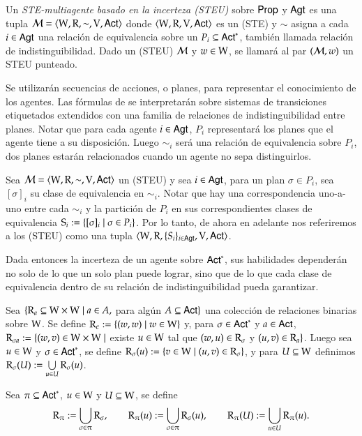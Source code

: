 \begin{definicion}
    Un \emph{STE-multiagente basado en la incerteza (STEU)} sobre $\PROP$ y $\AGT$ es una tupla $\model = \tup{\W,\R,\sim,\V,\ACT}$ 
    donde $\tup{\W,\R,\V,\ACT}$ es un (STE) y $\sim$ asigna a cada $i \in \AGT$ una relación de equivalencia sobre un 
    $P_i \subseteq \ACT^*$, también llamada relación de indistinguibilidad. Dado un (STEU) $\modults$ y $w \in \W$, se llamará 
    al par $(\modults,w)$ un STEU punteado.
\end{definicion}

Se utilizarán secuencias de acciones, o planes, para representar el conocimiento de los agentes. Las fórmulas de \KHilogic 
se interpretarán sobre sistemas de transiciones etiquetados extendidos con una familia de relaciones de indistinguibilidad entre planes. 
Notar que para cada agente $i \in \AGT$, $P_i$ representará los planes que el agente tiene a su disposición. Luego $\sim_i$ 
será una relación de equivalencia sobre $P_i$, dos planes estarán relacionados cuando un agente no sepa distinguirlos.

Sea $\model = \tup{\W,\R,\sim,\V,\ACT}$ un (STEU) y sea $i \in \AGT$, para un plan $\sigma \in P_i$, sea $[\sigma]_i$ su clase de 
equivalencia en $\sim_i$. Notar que hay una correspondencia uno-a-uno entre cada $\sim_i$ y la partición de $P_i$ en sus correspondientes 
clases de equivalencia $\S_i := \{[\sigma]_i \mid \sigma \in P_i\}$. Por lo tanto, de ahora en adelante nos referiremos a los (STEU) como
una tupla $\tup{\W,\R,\{S_i\}_{i \in \AGT},\V,\ACT}$.

Dada entonces la incerteza de un agente sobre $\ACT^*$, sus habilidades dependerán no solo de lo que un solo plan puede lograr, sino que de 
lo que cada clase de equivalencia dentro de su relación de indistinguibilidad pueda garantizar.


\begin{definicion}
    Sea $\{\R_a \subseteq \W \times \W \mid a \in A,$ para algún $A \subseteq \ACT \}$ una colección de relaciones binarias sobre $\W$. 
    Se define $\R_\epsilon := \{(w,w) \mid w \in \W\}$ y, para $\sigma \in \ACT^*$ y $a \in \ACT$, 
    $\R_{\sigma a} := \{(w,v) \in \W \times \W \mid$ existe $u \in \W$ tal que $(w,u) \in \R_\sigma$ y $(u,v) \in \R_a \}$. 
    Luego sea $u \in \W$ y $\sigma \in \ACT^*$, se define $\R_\sigma(u) := \{v\in\W \mid (u,v) \in \R_\sigma\}$, y para $U\subseteq\W$ 
    definimos $\R_\sigma(U) := \bigcup\limits_{u \in U} \R_\sigma(u)$.

    Sea $\pi \subseteq \ACT^*$, $u \in \W$ y $U \subseteq \W$, se define
    \[
        \R_\strategy := \bigcup_{\sigma \in \strategy} \R_{\sigma},
    \qquad
        \R_{\strategy}(u) := \bigcup_{\sigma \in \strategy} \R_\sigma(u),
    \qquad
        \R_{\strategy}(U) := \bigcup_{u \in U} \R_{\strategy}(u).
    \]
\end{definicion}

